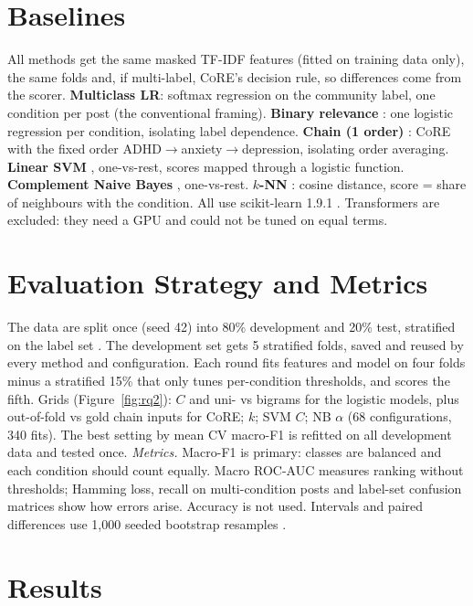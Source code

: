 \documentclass[sigconf]{acmart}
\newcommand{\core}{\textsc{CoRE}}
\begin{document}
\section{Baselines}
All methods get the same masked TF-IDF features (fitted on training data only), the same folds and, if multi-label, \core{}'s decision rule, so differences come from the scorer. \textbf{Multiclass LR}: softmax regression on the community label, one condition per post (the conventional framing). \textbf{Binary relevance} \cite{zhang2014review}: one logistic regression per condition, isolating label dependence. \textbf{Chain (1 order)} \cite{read2011classifier}: \core{} with the fixed order ADHD$\rightarrow$anxiety$\rightarrow$depression, isolating order averaging. \textbf{Linear SVM} \cite{joachims1998text}, one-vs-rest, scores mapped through a logistic function. \textbf{Complement Naive Bayes} \cite{rennie2003tackling}, one-vs-rest. \textbf{$k$-NN} \cite{cover1967nearest}: cosine distance, score = share of neighbours with the condition. All use scikit-learn 1.9.1 \cite{pedregosa2011scikit}. Transformers are excluded: they need a GPU and could not be tuned on equal terms.

\section{Evaluation Strategy and Metrics}
The data are split once (seed 42) into 80\% development and 20\% test, stratified on the label set \cite{sechidis2011stratification}. The development set gets 5 stratified folds, saved and reused by every method and configuration. Each round fits features and model on four folds minus a stratified 15\% that only tunes per-condition thresholds, and scores the fifth. Grids (Figure~\ref{fig:rq2}): $C$ and uni- vs bigrams for the logistic models, plus out-of-fold vs gold chain inputs for \core{}; $k$; SVM $C$; NB $\alpha$ (68 configurations, 340 fits). The best setting by mean CV macro-F1 is refitted on all development data and tested once.
\emph{Metrics.} Macro-F1 is primary: classes are balanced and each condition should count equally. Macro ROC-AUC measures ranking without thresholds; Hamming loss, recall on multi-condition posts and label-set confusion matrices show how errors arise. Accuracy is not used. Intervals and paired differences use 1,000 seeded bootstrap resamples \cite{efron1993bootstrap}.

\section{Results}
\end{document}
